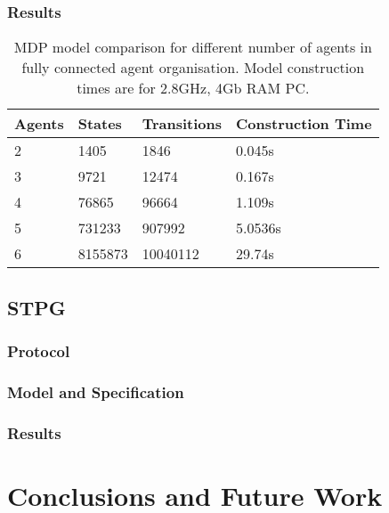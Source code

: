 \documentclass{llncs}
\begin{document}
\subsubsection{Results}
\begin{table}
 \centering
 \begin{tabular}{ | l | l | l | l |}
    \hline
    Agents & States & Transitions & Construction Time \\ \hline
    2 & 1405 & 1846 & 0.045s  \\ \hline
    3 & 9721 & 12474 & 0.167s \\ \hline
    4 & 76865 & 96664 & 1.109s \\ \hline
    5 & 731233 & 907992 & 5.0536s \\ \hline   
    6 & 8155873 & 10040112 & 29.74s \\ \hline   

\end{tabular}

\caption{MDP model comparison for different number of agents in fully connected agent organisation. Model construction times are for 2.8GHz, 4Gb RAM PC.}
\end{table}

\subsection{STPG}
\subsubsection{Protocol}
\subsubsection{Model and Specification}
\subsubsection{Results}

\section{Conclusions and Future Work}
\end{document}
